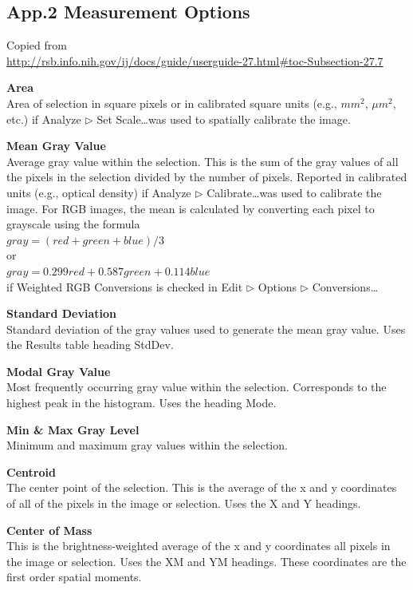 \clearpage
\subsection{App.2 Measurement Options}
\label{app2}
Copied from\\
\url{http://rsb.info.nih.gov/ij/docs/guide/userguide-27.html\#toc-Subsection-27.7}

\textbf{Area}\\Area of selection in square pixels or in calibrated
square units (e.g., $mm^2$, $\mu m^{2}$, etc.) if Analyze
${\triangleright}$ Set Scale\ldots was used to spatially calibrate the
image.

\textbf{Mean Gray Value}\\Average gray value within the selection.
This is the sum of the gray values of all the pixels in the selection
divided by the number of pixels. Reported in calibrated units (e.g.,
optical density) if Analyze ${\triangleright}$ Calibrate\ldots was
used to calibrate the image. For RGB images, the mean is calculated by
converting each pixel to grayscale using the formula\\
$gray=(red+green+blue)/3$\\
or\\
$gray=0.299 red + 0.587 green + 0.114 blue$\\
if Weighted RGB Conversions is checked in Edit ${\triangleright}$
Options ${\triangleright}$ Conversions\ldots




\textbf{Standard Deviation}\\Standard deviation of the gray values
used to generate the mean gray value. Uses the Results table heading
StdDev.

\textbf{Modal Gray Value}\\Most frequently occurring gray value
within the selection. Corresponds to the highest peak in the histogram.
Uses the heading Mode.

\textbf{Min \& Max Gray Level}\\Minimum and maximum gray values
within the selection.


\textbf{Centroid}\\The center point of the selection. This is the
average of the x and y coordinates of all of the pixels in the image or
selection. Uses the X and Y headings.

\textbf{Center of Mass}\\This is the brightness-weighted average of
the x and y coordinates all pixels in the image or selection. Uses the
XM and YM headings. These coordinates are the first order spatial
moments.

